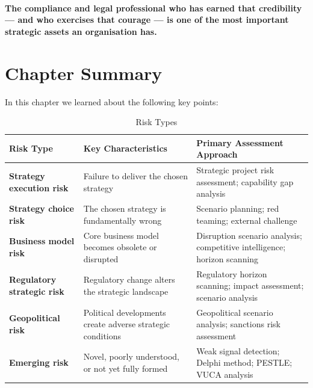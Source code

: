 \paragraph{The compliance and legal professional who has earned that credibility — and who exercises that courage — is one of the most important strategic assets an organisation has.}

\newpage
\section{Chapter Summary}
In this chapter we learned about the following key points:

\begin{table}[H]
  \centering
  \renewcommand{\arraystretch}{1.5}
  \begin{tabularx}{\textwidth}{ | >{\raggedright\arraybackslash}p{} 
								| >{\raggedright\arraybackslash}p{} 
                                | >{\raggedright\arraybackslash}X | }
    \hline
    \textbf{Risk Type} & \textbf{Key Characteristics} & \textbf{Primary Assessment Approach} \\
    \hline
    \textbf{Strategy execution risk} & Failure to deliver the chosen strategy & Strategic project risk assessment; capability gap analysis\\
    \hline
    \textbf{Strategy choice risk} & The chosen strategy is fundamentally wrong & Scenario planning; red teaming; external challenge\\
    \hline
    \textbf{Business model risk} & Core business model becomes obsolete or disrupted & Disruption scenario analysis; competitive intelligence; horizon scanning\\
    \hline
    \textbf{Regulatory strategic risk} & Regulatory change alters the strategic landscape & Regulatory horizon scanning; impact assessment; scenario analysis\\
    \hline
    \textbf{Geopolitical risk} & Political developments create adverse strategic conditions & Geopolitical scenario analysis; sanctions risk assessment\\
    \hline
    \textbf{Emerging risk} & Novel, poorly understood, or not yet fully formed & Weak signal detection; Delphi method; PESTLE; VUCA analysis\\
    \hline
  \end{tabularx}
  \caption{Risk Types}
\end{table}

